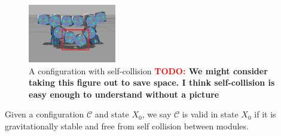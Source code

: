 \documentclass[graybox]{svmult}
\newcommand{\TODO}[1]{ {\bf \textcolor{red}{TODO:} #1 }}
\begin{document}
\begin{figure}
\sidecaption
\includegraphics[height=1in]{images/walkbot_collision.png}
\caption{A configuration with self-collision \TODO{We might consider taking
this figure out to save space. I think self-collision is easy enough to understand without a picture}}
\label{fig:smores_conf_collision}
\end{figure}

\begin{definition}
Given a configuration $\mathcal{C}$ and state \(X_0\), we say $\mathcal{C}$ is valid in
state \(X_0\) if it is gravitationally stable and free from self collision between
modules.  
\end{definition}
\end{document}
